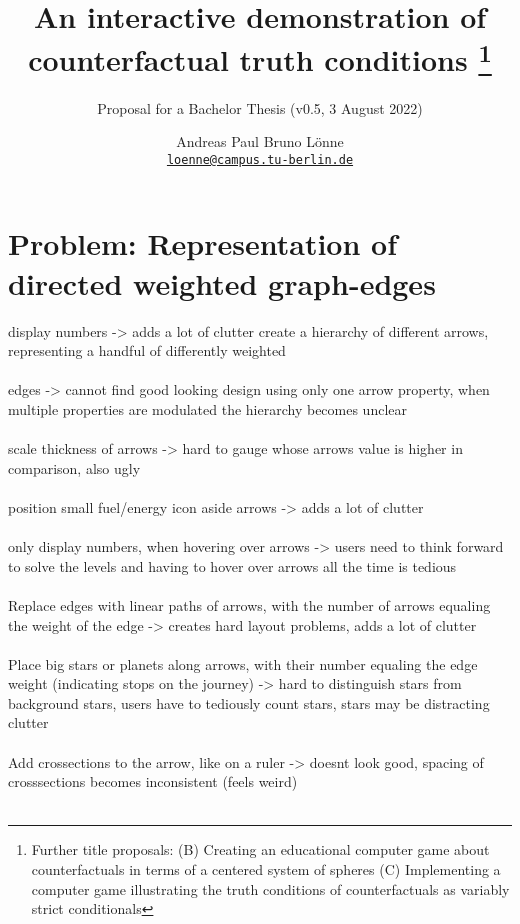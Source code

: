 \documentclass[a4paper,american]{paper}
\providecommand*{\code}[1]{\texttt{#1}}
\begin{document}
\title{An interactive demonstration of counterfactual truth conditions%
	\footnote{Further title proposals:
		(B) Creating an educational computer game about counterfactuals in terms of a centered system of spheres
		(C) Implementing a computer game illustrating the truth conditions of counterfactuals as variably strict conditionals
	}
}

\subtitle{Proposal for a Bachelor Thesis (v0.5, 3 August 2022)}

\author{%
	Andreas Paul Bruno Lönne\\
	\code{\href{mailto:loenne@campus.tu-berlin.de}{loenne@campus.tu-berlin.de}}
}


\maketitle

\section*{Problem: Representation of directed weighted graph-edges}
display numbers -> adds a lot of clutter
create a hierarchy of different arrows, representing a handful of differently weighted
\\\\
edges -> cannot find good looking design using only one arrow property, when multiple properties are modulated the hierarchy becomes unclear
\\\\
scale thickness of arrows -> hard to gauge whose arrows value is higher in comparison, also ugly
\\\\
position small fuel/energy icon aside arrows -> adds a lot of clutter
\\\\
only display numbers, when hovering over arrows -> users need to think forward to solve the levels and having to hover over arrows all the time is tedious
\\\\
Replace edges with linear paths of arrows, with the number of arrows equaling the weight of the edge -> creates hard layout problems, adds a lot of clutter
\\\\
Place big stars or planets along arrows, with their number equaling the edge weight (indicating stops on the journey) -> hard to distinguish stars from background stars, users have to tediously count stars, stars may be distracting clutter
\\\\
Add crossections to the arrow, like on a ruler -> doesnt look good, spacing of crosssections becomes inconsistent (feels weird)
\\\\
\end{document}
